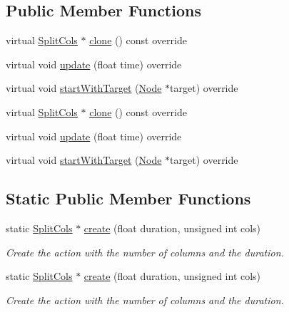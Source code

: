 \subsection*{Public Member Functions}
\begin{DoxyCompactItemize}
\item 
virtual \hyperlink{classSplitCols}{Split\+Cols} $\ast$ \hyperlink{classSplitCols_a97e5eee11d109590c63b1c542a90f01e}{clone} () const override
\item 
virtual void \hyperlink{classSplitCols_afa102b8f74e40bb4484a7470ff64fbef}{update} (float time) override
\item 
virtual void \hyperlink{classSplitCols_a6378035983a5b7f31ea3f3e2638a750c}{start\+With\+Target} (\hyperlink{classNode}{Node} $\ast$target) override
\item 
virtual \hyperlink{classSplitCols}{Split\+Cols} $\ast$ \hyperlink{classSplitCols_a209bd3c8ad9be47a9e9959bf9dc8afdf}{clone} () const override
\item 
virtual void \hyperlink{classSplitCols_ae1252964ea517f3e3254654758406a63}{update} (float time) override
\item 
virtual void \hyperlink{classSplitCols_ae9600d8beda7affc5d8eb29624978698}{start\+With\+Target} (\hyperlink{classNode}{Node} $\ast$target) override
\end{DoxyCompactItemize}
\subsection*{Static Public Member Functions}
\begin{DoxyCompactItemize}
\item 
static \hyperlink{classSplitCols}{Split\+Cols} $\ast$ \hyperlink{classSplitCols_a1d2e0205d47c575d4d931b9a6f5e3f7c}{create} (float duration, unsigned int cols)
\begin{DoxyCompactList}\small\item\em Create the action with the number of columns and the duration. \end{DoxyCompactList}\item 
static \hyperlink{classSplitCols}{Split\+Cols} $\ast$ \hyperlink{classSplitCols_a3aa5b831123bbe72a0e0cdae8e9032a1}{create} (float duration, unsigned int cols)
\begin{DoxyCompactList}\small\item\em Create the action with the number of columns and the duration. \end{DoxyCompactList}\end{DoxyCompactItemize}
